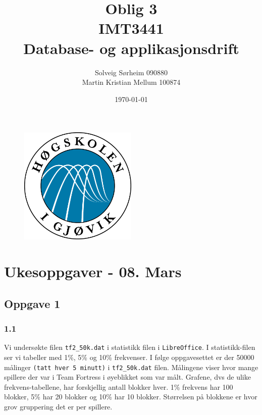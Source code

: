 \documentclass[a4paper, norsk, 12pt]{article}
\title{Oblig 3 \\ IMT3441 \\ Database- og applikasjonsdrift}
\author{Solveig Sørheim 090880 \\ Martin Kristian Mellum 100874}
\date{\today}
\begin{document}
\begin{figure}[h!]
 \centering
  \includegraphics[width=0.5\textwidth]{Images/hig_logo.png}
 \maketitle       %
\end{figure}
\pagebreak
\tableofcontents %
\pagebreak	%

\section{Ukesoppgaver - 08. Mars}
\subsection{Oppgave 1}
\subsubsection*{1.1}
Vi undersøkte filen \verb|tf2_50k.dat| i statistikk filen i \verb|LibreOffice|. I statistikk-filen ser vi tabeller med 1\%, 5\% og 10\% frekvenser. I følge oppgavesettet er der 50000 målinger \verb|(tatt hver 5 minutt)| i \verb|tf2_50k.dat| filen.  Målingene viser hvor mange spillere der var i Team Fortress i øyeblikket som var målt. Grafene, dvs de ulike frekvens-tabellene, har forskjellig antall blokker hver. 1\% frekvens har 100 blokker, 5\% har 20 blokker og 10\% har 10 blokker. Størrelsen på blokkene er hvor grov gruppering det er per spillere.\\
\end{document}
